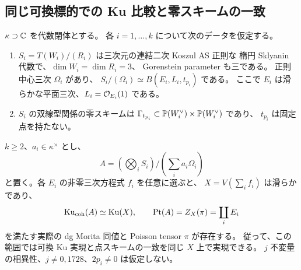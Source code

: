 \subsection{同じ可換標的での Ku 比較と零スキームの一致}

\begin{theorem}
\label{pps:thm:elliptic-existence}
$\kappa\supset\mathbb C$ を代数閉体とする。
各 $i=1,\ldots,k$ について次のデータを仮定する。
\begin{enumerate}
 \item $S_i=T(W_i)/(R_i)$ は三次元の連結二次 Koszul AS 正則な
 楕円 Sklyanin 代数で、$\dim W_i=\dim R_i=3$、
 Gorenstein parameter も三である。
 正則中心三次 $\Omega_i$ があり、
 $S_i/(\Omega_i)\simeq B(E_i,L_i,t_{p_i})$ である。
 ここで $E_i$ は滑らかな平面三次、$L_i=\mathcal O_{E_i}(1)$ である。
 \item $S_i$ の双線型関係の零スキームは
 $\Gamma_{t_{p_i}}\subset\mathbb P(W_i^\vee)\times\mathbb P(W_i^\vee)$ であり、
 $t_{p_i}$ は固定点を持たない。
\end{enumerate}
$k\ge2$、$a_i\in\kappa^\times$ とし、
\[
 A=\left(\bigotimes_iS_i\right)\Big/\left(\sum_i a_i\Omega_i\right)
\]
と置く。各 $E_i$ の非零三次方程式 $f_i$ を任意に選ぶと、
$X=V(\sum_i f_i)$ は滑らかであり、
\begin{equation}\label{pps:eq:elliptic-existence}
 \operatorname{Ku}_{\mathrm{coh}}(A)\simeq\operatorname{Ku}(X),\qquad
 \operatorname{Pt}(A)=Z_X(\pi)=\coprod_iE_i
\end{equation}
を満たす実際の dg Morita 同値と Poisson tensor $\pi$ が存在する。
従って、この範囲では可換 Ku 実現と点スキームの一致を同じ $X$ 上で実現できる。
$j$ 不変量の相異性、$j\ne0,1728$、$2p_i\ne0$ は仮定しない。
\end{theorem}

